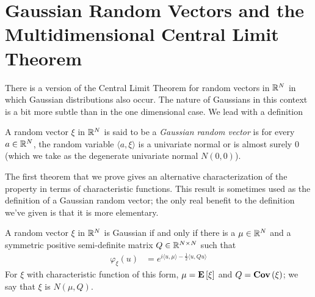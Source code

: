 \section{Gaussian Random Vectors and the Multidimensional Central
  Limit Theorem}
There is a version of the Central Limit Theorem for random vectors in
$\mathbb{R}^N$ in which Gaussian distributions also occur.  The nature of
Gaussians in this context is a bit more subtle than in the one
dimensional case.  We lead with a definition
\begin{defn}A random vector $\xi$ in $\mathbb{R}^N$ is said to be a \emph{Gaussian random
  vector} is for every $a \in \mathbb{R}^N$, the random variable $\langle
  a,\xi \rangle$ is a univariate normal or is almost surely 0 (which
  we take as the degenerate univariate normal $N(0,0)$).
\end{defn}
The first theorem that we prove gives an alternative characterization
of the property in terms of characteristic functions.  This result is
sometimes used as the definition of a Gaussian random vector; the only
real benefit to the definition we've given is that it is more
elementary.
\begin{thm}\label{GaussianVectorCharacteristicFunction}A random vector
  $\xi$ in $\mathbb{R}^N$ is Gaussian if and only if there is a $\mu \in
  \mathbb{R}^N$ and a symmetric positive semi-definite matrix $Q \in
  \mathbb{R}^{N\times N}$ such that 
\begin{align*}
\varphi_\xi(u) &= e^{i\langle u, \mu\rangle - \frac{1}{2}\langle u, Qu
\rangle}
\end{align*}
For $\xi$ with characteristic function of this form, $\mu =
\textbf{E}\left[\xi\right]$ and $Q = \textbf{Cov} \left (\xi \right )$; we say that $\xi$ is
$N(\mu, Q)$.
\end{thm}
